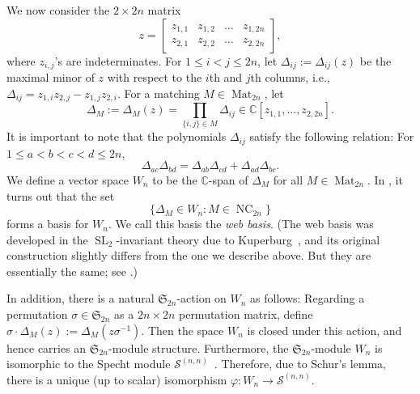 \documentclass[reqno,12pt]{amsart}
\theoremstyle{definition}
\theoremstyle{remark}
\newcommand\CC{\mathbb{C}}
\newcommand\Spec{\mathcal{S}}
\newcommand\NC{\operatorname{NC}}
\newcommand\Mat{\operatorname{Mat}}
\newcommand\SL{\operatorname{SL}}
\newcommand\SYM{\mathfrak{S}}
\begin{document}
We now consider the \( 2 \times 2n \) matrix
\[
  z = 
  \begin{bmatrix}
    z_{1,1} & z_{1,2} & \dots & z_{1,2n} \\
    z_{2,1} & z_{2,2} & \dots & z_{2,2n}
  \end{bmatrix},
\]
where \( z_{i,j} \)'s are indeterminates.
For \( 1\le i<j\le 2n \), let \( \Delta_{ij}:=\Delta_{ij}(z) \) be the maximal minor of \( z \) with respect to the \( i \)th and \( j \)th columns,
i.e., \( \Delta_{ij} = z_{1,i} z_{2,j} - z_{1,j} z_{2,i} \).
For a matching \( M\in\Mat_{2n} \), let
\[
  \Delta_M := \Delta_M(z) = \prod_{\{i,j\}\in M} \Delta_{ij} \in \CC[z_{1,1},\dots,z_{2,2n}].
\]
It is important to note that the polynomials \( \Delta_{ij} \) satisfy the following relation:
For \( 1\le a<b<c<d \le 2n\),
\begin{equation} \label{eq:syzygy}
  \Delta_{ac} \Delta_{bd}
    = \Delta_{ab} \Delta_{cd} + \Delta_{ad} \Delta_{bc}.
\end{equation}
We define a vector space \( W_n \) to be the \( \CC \)-span of \( \Delta_M \)
for all \( M\in\Mat_{2n} \).
In \cite{KR84}, it turns out that the set
\begin{equation} \label{eq:basis_NC}
  \{ \Delta_{M}\in W_n : M\in\NC_{2n} \}
\end{equation}
forms a basis for \( W_n \). We call this basis the \emph{web basis}.
(The web basis was developed in the \( \SL_2 \)-invariant theory
due to Kuperburg~\cite{Kup96},
and its original construction slightly differs from the one we describe above.
But they are essentially the same; see \cite{Rho19}.)

In addition, there is a natural \( \SYM_{2n} \)-action on \( W_n \)
as follows: Regarding a permutation \( \sigma\in\SYM_{2n} \) as
a \( 2n\times 2n \) permutation matrix, define \( \sigma\cdot \Delta_M(z)
:= \Delta_M(z\sigma^{-1}) \).
Then the space \( W_n \) is closed under this action,
and hence carries an \( \SYM_{2n} \)-module structure.
Furthermore, the \( \SYM_{2n} \)-module \( W_n \) is isomorphic to
the Specht module \( \Spec^{(n,n)} \)~\cite{PPR09}.
Therefore, due to Schur's lemma, there is a unique (up to scalar)
isomorphism \( \varphi:W_n \rightarrow \Spec^{(n,n)} \).
\end{document}
